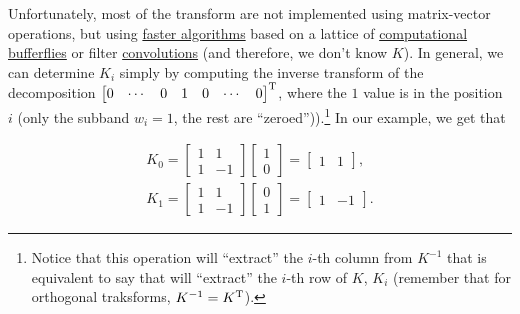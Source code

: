 Unfortunately, most of the transform are not implemented using
matrix-vector operations, but using
\href{https://en.wikipedia.org/wiki/Fast_Fourier_transform}{faster
  algorithms} based on a lattice of
\href{https://en.wikipedia.org/wiki/Butterfly_diagram}{computational
  bufferflies} or filter
\href{https://en.wikipedia.org/wiki/Filter_(signal_processing)}{convolutions}
(and therefore, we don't know $K$). In general, we can determine $K_i$
simply by computing the inverse transform of the decomposition
$\begin{bmatrix} 0 & \cdots & 0 & 1 & 0 & \cdots &
  0 \end{bmatrix}^{\text T}$, where the $1$ value is in the position
$i$ (only the subband $w_i=1$, the rest are
``zeroed'')).\footnote{Notice that this operation will ``extract'' the
  $i$-th column from $K^{-1}$ that is equivalent to say that will
  ``extract'' the $i$-th row of $K$, $K_i$ (remember that for
  orthogonal traksforms, $K^{-1}=K^{\text T}$).} In our example, we
get that

\begin{equation}
  \begin{array}{l}
    K_0 =
    \begin{bmatrix}
      1 & 1 \\
      1 & -1
    \end{bmatrix}
          \begin{bmatrix}
            1 \\
            0
          \end{bmatrix}
    =
    \begin{bmatrix}
      1 & 1
    \end{bmatrix},
    \\
    K_1 = 
    \begin{bmatrix}
      1 & 1 \\
      1 & -1
    \end{bmatrix}
          \begin{bmatrix}
            0 \\
            1
          \end{bmatrix}
    =
    \begin{bmatrix}
      1 & -1
    \end{bmatrix}.
  \end{array}
\end{equation}

